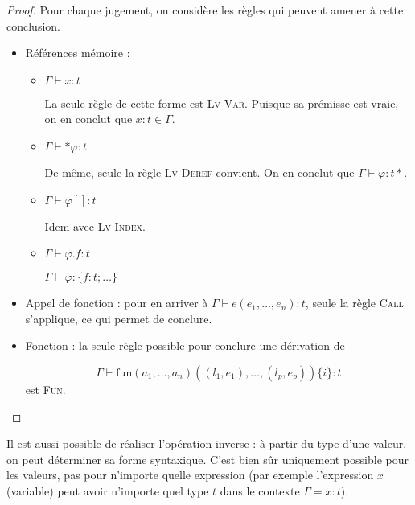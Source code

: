\begin{proof}

  Pour chaque jugement, on considère les règles qui peuvent amener à cette
  conclusion.

\begin{itemize}
\item
  Références mémoire :

  \begin{itemize}

    \item $Γ ⊢ x : t$

      La seule règle de cette forme est \textsc{Lv-Var}. Puisque sa prémisse est
      vraie, on en conclut que $x : t ∈ Γ$.

    \item $Γ ⊢ *φ : t$

      De même, seule la règle \textsc{Lv-Deref} convient. On en conclut que $Γ ⊢ φ : t*$.

    \item $Γ ⊢ φ[] : t$

      Idem avec \textsc{Lv-Index}.

    \item $Γ ⊢ φ.f : t$

      $Γ ⊢ φ : \{ f: t ; … \}$ %

  \end{itemize}

\item
  Appel de fonction : pour en arriver à $Γ ⊢ e (e_1, …, e_n) : t$, seule la
  règle \textsc{Call} s'applique, ce qui permet de conclure.

\item Fonction : la seule règle possible pour conclure une dérivation de

  \[
    Γ ⊢ \mathrm{fun} (a_1, …, a_n) ((l_1, e_1), …, (l_p, e_p)) \{i\} : t
  \]
  est \textsc{Fun}.

\end{itemize}
\end{proof}

Il est aussi possible de réaliser l'opération inverse : à partir du type d'une
valeur, on peut déterminer sa forme syntaxique. C'est bien sûr uniquement
possible pour les valeurs, pas pour n'importe quelle expression (par exemple
l'expression $x$ (variable) peut avoir n'importe quel type $t$ dans le contexte
$Γ = x:t$).

